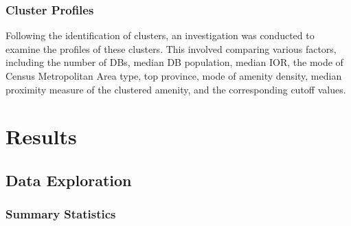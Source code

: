 \documentclass[11pt, a4paper]{article}
\begin{document}
\subsubsection{Cluster Profiles}


Following the identification of clusters, an investigation was conducted to examine the profiles of these clusters. This involved comparing various factors, including the number of DBs, median DB population, median IOR, the mode of Census Metropolitan Area type, top province, mode of amenity density, median proximity measure of the clustered amenity, and the corresponding cutoff values.





















\pagebreak
\section{Results}




\subsection{Data Exploration}

\subsubsection{Summary Statistics}
\end{document}
